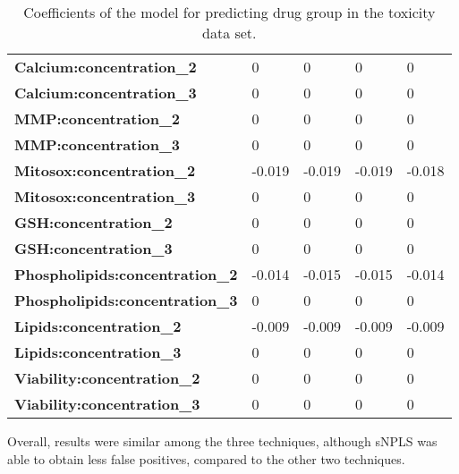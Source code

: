 \begin{table}[hbtp]
{\begin{tabular}{@{}lllll@{}}
\textbf{Calcium:concentration\_2}       & 0                                   & 0                                   & 0               & 0               \\
\textbf{Calcium:concentration\_3}       & 0                                   & 0                                   & 0               & 0               \\
\textbf{MMP:concentration\_2}           & 0                                   & 0                                   & 0               & 0               \\
\textbf{MMP:concentration\_3}           & 0                                   & 0                                   & 0               & 0               \\
\textbf{Mitosox:concentration\_2}       & -0.019                              & -0.019                              & -0.019          & -0.018          \\
\textbf{Mitosox:concentration\_3}       & 0                                   & 0                                   & 0               & 0               \\
\textbf{GSH:concentration\_2}           & 0                                   & 0                                   & 0               & 0               \\
\textbf{GSH:concentration\_3}          & 0                                   & 0                                   & 0               & 0               \\
\textbf{Phospholipids:concentration\_2} & -0.014                              & -0.015                              & -0.015          & -0.014          \\
\textbf{Phospholipids:concentration\_3} & 0                                   & 0                                   & 0               & 0               \\
\textbf{Lipids:concentration\_2}        & -0.009                              & -0.009                              & -0.009          & -0.009          \\
\textbf{Lipids:concentration\_3}        & 0                                   & 0                                   & 0               & 0               \\
\textbf{Viability:concentration\_2}     & 0                                   & 0                                   & 0               & 0               \\
\textbf{Viability:concentration\_3}     & 0                                   & 0                                   & 0               & 0               \\ \bottomrule
\end{tabular}}
\caption{Coefficients of the model for predicting drug group in the toxicity data set.}
\label{table:toxicity_results}
\end{table}

Overall, results were similar among the three techniques, although sNPLS was able to obtain less false positives, compared to the other two techniques.